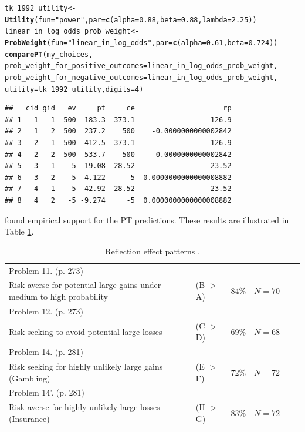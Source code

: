 \documentclass{article}\usepackage[]{graphicx}\usepackage[]{color}
\makeatletter
\newcommand{\hlnum}[1]{\textcolor[rgb]{0.686,0.059,0.569}{#1}}%
\newcommand{\hlstr}[1]{\textcolor[rgb]{0.192,0.494,0.8}{#1}}%
\newcommand{\hlstd}[1]{\textcolor[rgb]{0.345,0.345,0.345}{#1}}%
\newcommand{\hlkwb}[1]{\textcolor[rgb]{0.69,0.353,0.396}{#1}}%
\newcommand{\hlkwc}[1]{\textcolor[rgb]{0.333,0.667,0.333}{#1}}%
\newcommand{\hlkwd}[1]{\textcolor[rgb]{0.737,0.353,0.396}{\textbf{#1}}}%
\newenvironment{kframe}{%
 \def\at@end@of@kframe{}%
 \ifinner\ifhmode%
  \def\at@end@of@kframe{\end{minipage}}%
  \begin{minipage}{\columnwidth}%
 \fi\fi%
 \def\FrameCommand##1{\hskip\@totalleftmargin \hskip-\fboxsep
 \colorbox{shadecolor}{##1}\hskip-\fboxsep
     \hskip-\linewidth \hskip-\@totalleftmargin \hskip\columnwidth}%
 \MakeFramed {\advance\hsize-\width
   \@totalleftmargin\z@ \linewidth\hsize
   \@setminipage}}%
 {\par\unskip\endMakeFramed%
 \at@end@of@kframe}
\newenvironment{knitrout}{}{} %
\makeatother
\begin{document}
\begin{knitrout}
\color{fgcolor}\begin{kframe}
\begin{alltt}
\hlstd{tk_1992_utility} \hlkwb{<-} \hlkwd{Utility}\hlstd{(}\hlkwc{fun}\hlstd{=}\hlstr{"power"}\hlstd{,} \hlkwc{par}\hlstd{=}\hlkwd{c}\hlstd{(}\hlkwc{alpha}\hlstd{=}\hlnum{0.88}\hlstd{,} \hlkwc{beta}\hlstd{=}\hlnum{0.88}\hlstd{,} \hlkwc{lambda}\hlstd{=}\hlnum{2.25}\hlstd{))}
\hlstd{linear_in_log_odds_prob_weight} \hlkwb{<-} \hlkwd{ProbWeight}\hlstd{(}\hlkwc{fun}\hlstd{=}\hlstr{"linear_in_log_odds"}\hlstd{,} \hlkwc{par}\hlstd{=}\hlkwd{c}\hlstd{(}\hlkwc{alpha}\hlstd{=}\hlnum{0.61}\hlstd{,} \hlkwc{beta}\hlstd{=}\hlnum{0.724}\hlstd{))}
\hlkwd{comparePT}\hlstd{(my_choices,}
        \hlkwc{prob_weight_for_positive_outcomes}\hlstd{=linear_in_log_odds_prob_weight,}
        \hlkwc{prob_weight_for_negative_outcomes}\hlstd{=linear_in_log_odds_prob_weight,}
        \hlkwc{utility}\hlstd{=tk_1992_utility,} \hlkwc{digits}\hlstd{=}\hlnum{4}\hlstd{)}
\end{alltt}
\begin{verbatim}
##   cid gid   ev     pt     ce                     rp
## 1   1   1  500  183.3  373.1                  126.9
## 2   1   2  500  237.2    500    -0.0000000000002842
## 3   2   1 -500 -412.5 -373.1                 -126.9
## 4   2   2 -500 -533.7   -500     0.0000000000002842
## 5   3   1    5  19.08  28.52                 -23.52
## 6   3   2    5  4.122      5 -0.0000000000000008882
## 7   4   1   -5 -42.92 -28.52                  23.52
## 8   4   2   -5 -9.274     -5  0.0000000000000008882
\end{verbatim}
\end{kframe}
\end{knitrout}


\cite{Kahneman_Tversky_1979} found empirical support for the PT predictions. These results are illustrated in
Table \ref{reflection_effect_table}.

\begin{table}[h]
\caption{Reflection effect patterns \cite[from][]{Kahneman_Tversky_1979}.}
\centering
\begin{tabular}{ l l l l l l }
\hline
Problem 11. (p. 273) \\
Risk averse for potential large gains under medium to high probability & (B $>$ A) & $84\%$ & $N=70$ \\
Problem 12. (p. 273) \\
Risk seeking to avoid potential large losses & (C $>$ D) & $69\%$ & $N=68$ \\
Problem 14. (p. 281) \\
Risk seeking for highly unlikely large gains (Gambling) & (E $>$ F) & $72\%$ & $N=72$ \\
Problem 14'. (p. 281) \\
Risk averse for highly unlikely large losses (Insurance) & (H $>$ G) & $83\%$ & $N=72$ \\
\hline
\end{tabular}
\label{reflection_effect_table}
\end{table}
\end{document}
